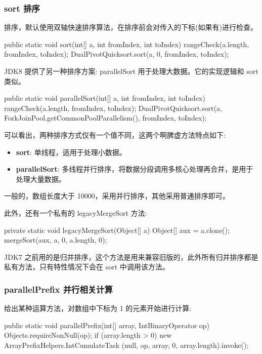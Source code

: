 \subsubsection*{sort 排序}

排序，默认使用双轴快速排序算法，在排序前会对传入的下标(如果有)进行检查。

\begin{Java}
public static void sort(int[] a, int fromIndex, int toIndex) {
    rangeCheck(a.length, fromIndex, toIndex);
    DualPivotQuicksort.sort(a, 0, fromIndex, toIndex);
}
\end{Java}

JDK8 提供了另一种排序方案: parallelSort 用于处理大数据。它的实现逻辑和 sort 类似。

\begin{Java}
public static void parallelSort(int[] a, int fromIndex, int toIndex) {
    rangeCheck(a.length, fromIndex, toIndex);
    DualPivotQuicksort.sort(a, ForkJoinPool.getCommonPoolParallelism(), fromIndex, toIndex);
}
\end{Java}

可以看出，两种排序方式仅有一个值不同，这两个啊脾虚方法特点如下:
\begin{itemize}
    \item \textbf{sort}: 单线程，适用于处理小数据。
    \item \textbf{parallelSort}: 多线程并行排序，将数据分段调用多核心处理再合并，是用于处理大量数据。
\end{itemize}

一般的，数组长度大于 10000，采用并行排序，其他采用普通排序即可。

此外，还有一个私有的 legacyMergeSort 方法:

\begin{Java}
private static void legacyMergeSort(Object[] a) {
    Object[] aux = a.clone();
    mergeSort(aux, a, 0, a.length, 0);
}
\end{Java}

JDK7 之前用的是归并排序，这个方法是用来兼容旧版的，此外所有归并排序都是私有方法，只有特性情况下会在 sort 中调用该方法。

\subsubsection*{parallelPrefix 并行相关计算}

给出某种运算方法，对数组中下标为 1 的元素开始进行计算:

\begin{Java}
public static void parallelPrefix(int[] array, IntBinaryOperator op) {
    Objects.requireNonNull(op);
    if (array.length > 0)
        new ArrayPrefixHelpers.IntCumulateTask
                (null, op, array, 0, array.length).invoke();
}
\end{Java}

